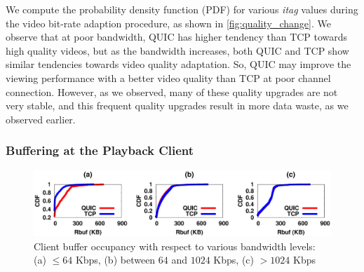 We compute the probability density function (PDF) for various \textit{itag} values during the video bit-rate adaption procedure, as shown in \fig\ref{fig:quality_change}. 
We observe that at poor bandwidth, QUIC has higher tendency than TCP towards high quality videos, but as the bandwidth increases, both QUIC and TCP show similar tendencies towards video quality adaptation. So, QUIC may improve the viewing performance with a better video quality than TCP  at poor channel connection. However, as we observed, many of these quality upgrades are not very stable, and this frequent quality upgrades result in more data waste, as we observed earlier. 

\subsubsection{Buffering at the Playback Client}

\begin{figure}[!t]
	\captionsetup[subfigure]{}
	\begin{center}
        \includegraphics[width=\linewidth]{img/plotdata/CDF/Rbuf/plot_rbuf_bucket123}
		\caption{\label{fig:rbuf}Client buffer occupancy with respect to various bandwidth levels: (a) $\leq 64$ Kbps, (b)  between $64$ and $1024$ Kbps, (c) $> 1024$ Kbps}
	\end{center}
\end{figure}


